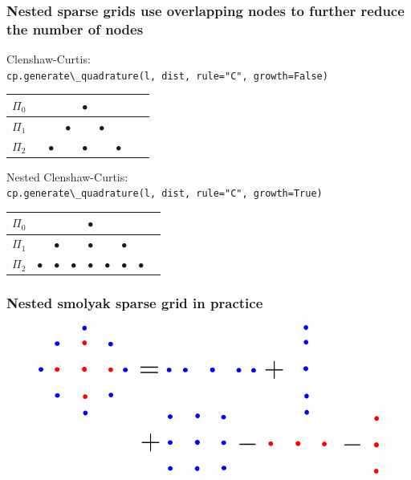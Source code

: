 \documentclass{beamer}
\begin{document}
 \begin{frame}
  \frametitle{Nested sparse grids use overlapping nodes to further reduce
  the number of nodes}

  \begin{alert}
      {Clenshaw-Curtis:}\\
      \scriptsize
      \verb;cp.generate\_quadrature(l, dist, rule="C", growth=False);
    \normalsize
  \begin{table}
  \begin{tabular}{lcccccccc}
    $\Pi_0$& &&& $\bullet$& &&&  \\\hline
   $\Pi_1$ &&&$\bullet$& &$\bullet$&&& \\\hline
   $\Pi_2$ &&$\bullet$&&$\bullet$ &&$\bullet$&& \\
   \end{tabular}
  \end{table}
  \end{alert}
  \pause
  \begin{alert}
      {Nested Clenshaw-Curtis:}\\
      \scriptsize
     \verb;cp.generate\_quadrature(l, dist, rule="C", growth=True);
    \normalsize
  \begin{table}
  \begin{tabular}{lcccccccc}
    $\Pi_0$& &&& $\bullet$& &&&  \\\hline
   $\Pi_1$ &&$\bullet$&& $\bullet$&&$\bullet$ && \\\hline
   $\Pi_2$ &$\bullet$&$\bullet$&$\bullet$& $\bullet$&$\bullet$&$\bullet$ &$\bullet$& \\
   \end{tabular}
  \end{table}
  \end{alert}

  \end{frame}

\begin{frame}
 \frametitle{Nested smolyak sparse grid in practice}


 \begin{figure}
  \includegraphics[width=\textwidth]{smolyak_nested.png}
 \end{figure}

\end{frame}
\end{document}
